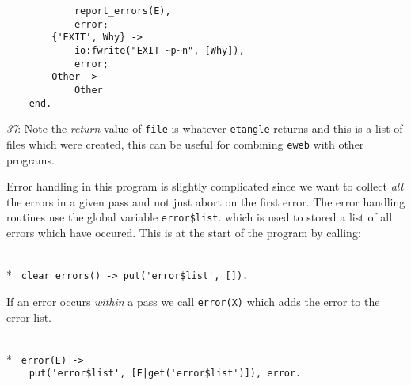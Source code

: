 \begin{flushleft}
\noindent{}%
\verb&            report_errors(E),&\\
\noindent{}%
\verb&            error;&\\
\noindent{}%
\verb&        {'EXIT', Why} ->&\\
\noindent{}%
\verb&            io:fwrite("EXIT ~p~n", [Why]),&\\
\noindent{}%
\verb&            error;&\\
\noindent{}%
\verb&        Other ->&\\
\noindent{}%
\verb&            Other&\\
\noindent{}%
\verb&    end.&\\
\end{flushleft}

{\sl 37}: Note the {\sl return\/} value of \verb+file+ is whatever
\verb+etangle+ returns and this is a list of files which were created,
this can be useful for combining \verb+eweb+ with other programs.

Error handling in this program is slightly complicated since
we want to collect {\sl all\/} the errors in a given pass
and not just abort on the first error.
The error handling routines use the global variable \verb+error$list+.
which is used to stored a list of all errors which have occured.
This is at the start of the program by calling:

\begin{flushleft}
\label{error handling_start}
\\*
\tt
\noindent{}%
\verb&clear_errors() -> put('error$list', []).&\\
\end{flushleft}

If an error occurs {\sl within} a pass we call \verb+error(X)+ 
which adds the error to the error list.

\begin{flushleft}
\label{error handling_2_5}
\\*
\tt
\noindent{}%
\verb&error(E) -> &\\
\noindent{}%
\verb&    put('error$list', [E|get('error$list')]), error.&\\
\end{flushleft}

